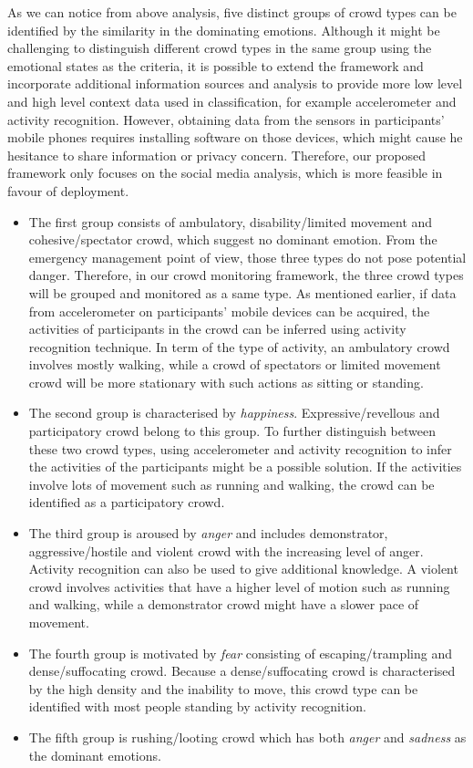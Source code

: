 As we can notice from above analysis, five distinct groups of crowd types can be identified by the similarity in the dominating emotions. Although it might be challenging to distinguish different crowd types in the same group using the emotional states as the criteria, it is possible to extend the framework and incorporate additional information sources and analysis to provide more low level and high level context data used in classification, for example accelerometer and activity recognition. However, obtaining data from the sensors in participants' mobile phones requires installing software on those devices, which might cause he hesitance to share information or privacy concern. Therefore, our proposed framework only focuses on the social media analysis, which is more feasible in favour of deployment.

\begin{itemize}
\item The first group consists of ambulatory, disability/limited movement and cohesive/spectator crowd, which suggest no dominant emotion. From the emergency management point of view, those three types do not pose potential danger. Therefore, in our crowd monitoring framework, the three crowd types will be grouped and monitored as a same type. As mentioned earlier, if data from accelerometer on participants' mobile devices can be acquired, the activities of participants in the crowd can be inferred using activity recognition technique. In term of the type of activity, an ambulatory crowd involves mostly walking, while a crowd of spectators or limited movement crowd will be more stationary with such actions as sitting or standing.

\item The second group is characterised by \textit{happiness}. Expressive/revellous and participatory crowd belong to this group. To further distinguish between these two crowd types, using accelerometer and activity recognition to infer the activities of the participants might be a possible solution. If the activities involve lots of movement such as running and walking, the crowd can be identified as a participatory crowd.

\item The third group is aroused by \textit{anger} and includes demonstrator, aggressive/hostile and violent crowd with the increasing level of anger. Activity recognition can also be used to give additional knowledge. A violent crowd involves activities that have a higher level of motion such as running and walking, while a demonstrator crowd might have a slower pace of movement.

\item The fourth group is motivated by \textit{fear} consisting of escaping/trampling and dense/suffocating crowd. Because a dense/suffocating crowd is characterised by the high density and the inability to move, this crowd type can be identified with most people standing by activity recognition.

\item The fifth group is rushing/looting crowd which has both \textit{anger} and \textit{sadness} as the dominant emotions.
\end{itemize}

